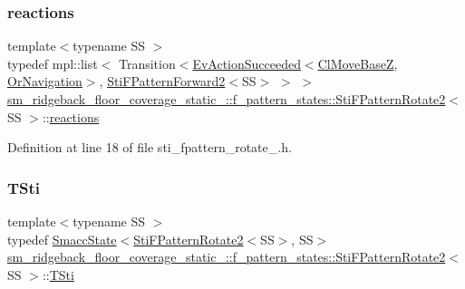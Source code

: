 \subsubsection{\texorpdfstring{reactions}{reactions}}
{\footnotesize\ttfamily template$<$typename SS $>$ \\
typedef mpl\+::list$<$ Transition$<$\hyperlink{structsmacc_1_1default__events_1_1EvActionSucceeded}{Ev\+Action\+Succeeded}$<$\hyperlink{classcl__move__base__z_1_1ClMoveBaseZ}{Cl\+Move\+BaseZ}, \hyperlink{classsm__ridgeback__floor__coverage__static__1_1_1OrNavigation}{Or\+Navigation}$>$, \hyperlink{classsm__ridgeback__floor__coverage__static__1_1_1f__pattern__states_1_1StiFPatternForward2}{Sti\+F\+Pattern\+Forward2}$<$SS$>$ $>$ $>$ \hyperlink{classsm__ridgeback__floor__coverage__static__1_1_1f__pattern__states_1_1StiFPatternRotate2}{sm\+\_\+ridgeback\+\_\+floor\+\_\+coverage\+\_\+static\+\_\+::f\+\_\+pattern\+\_\+states\+::\+Sti\+F\+Pattern\+Rotate2}$<$ SS $>$\+::\hyperlink{classsm__ridgeback__floor__coverage__static__1_1_1f__pattern__states_1_1StiFPatternRotate2_adc889d5fb137e13d27696f9530dc49b9}{reactions}}



Definition at line 18 of file sti\+\_\+fpattern\+\_\+rotate\+\_.\+h.

\mbox{\label{classsm__ridgeback__floor__coverage__static__1_1_1f__pattern__states_1_1StiFPatternRotate2_ab08090a9f9e8fa4635eed17d1c8c2e68}} 
\subsubsection{\texorpdfstring{T\+Sti}{TSti}}
{\footnotesize\ttfamily template$<$typename SS $>$ \\
typedef \hyperlink{classSmaccState}{Smacc\+State}$<$\hyperlink{classsm__ridgeback__floor__coverage__static__1_1_1f__pattern__states_1_1StiFPatternRotate2}{Sti\+F\+Pattern\+Rotate2}$<$SS$>$, SS$>$ \hyperlink{classsm__ridgeback__floor__coverage__static__1_1_1f__pattern__states_1_1StiFPatternRotate2}{sm\+\_\+ridgeback\+\_\+floor\+\_\+coverage\+\_\+static\+\_\+::f\+\_\+pattern\+\_\+states\+::\+Sti\+F\+Pattern\+Rotate2}$<$ SS $>$\+::\hyperlink{classsm__ridgeback__floor__coverage__static__1_1_1f__pattern__states_1_1StiFPatternRotate2_ab08090a9f9e8fa4635eed17d1c8c2e68}{T\+Sti}}



